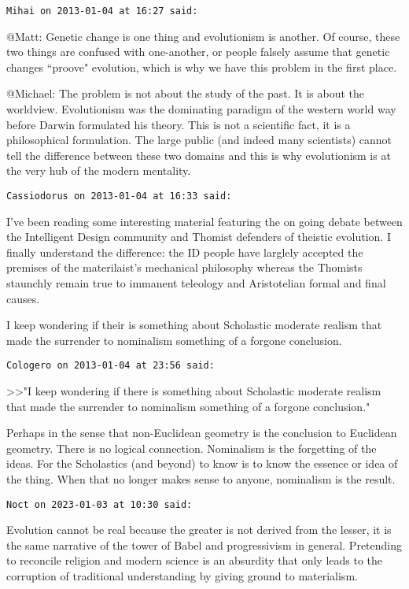 \begin{footnotesize}
\begin{sffamily}
\hfill

\texttt{Mihai on 2013-01-04 at 16:27 said: }

@Matt: Genetic change is one thing and evolutionism is another. Of course, these two things are confused with one-another, or people falsely assume that genetic changes ``proove" evolution, which is why we have this problem in the first place.

@Michael: The problem is not about the study of the past. It is about the worldview. Evolutionism was the dominating paradigm of the western world way before Darwin formulated his theory. This is not a scientific fact, it is a philosophical formulation. The large public (and indeed many scientists) cannot tell the difference between these two domains and this is why evolutionism is at the very hub of the modern mentality.


\hfill

\texttt{Cassiodorus on 2013-01-04 at 16:33 said: }

I've been reading some interesting material featuring the on going debate between the Intelligent Design community and Thomist defenders of theistic evolution. I finally understand the difference: the ID people have larglely accepted the premises of the materilaist's mechanical philosophy whereas the Thomists staunchly remain true to immanent teleology and Aristotelian formal and final causes.

I keep wondering if their is something about Scholastic moderate realism that made the surrender to nominalism something of a forgone conclusion.


\hfill

\texttt{Cologero on 2013-01-04 at 23:56 said: }

{\textgreater}{\textgreater}"I keep wondering if there is something about Scholastic moderate realism that made the surrender to nominalism something of a forgone conclusion."

Perhaps in the sense that non-Euclidean geometry is the conclusion to Euclidean geometry. There is no logical connection. Nominalism is the forgetting of the ideas. For the Scholastics (and beyond) to know is to know the essence or idea of the thing. When that no longer makes sense to anyone, nominalism is the result.


\hfill

\texttt{Noct on 2023-01-03 at 10:30 said: }

Evolution cannot be real because the greater is not derived from the lesser, it is the same narrative of the tower of Babel and progressivism in general. Pretending to reconcile religion and modern science is an absurdity that only leads to the corruption of traditional understanding by giving ground to materialism.


\end{sffamily}
\end{footnotesize}
